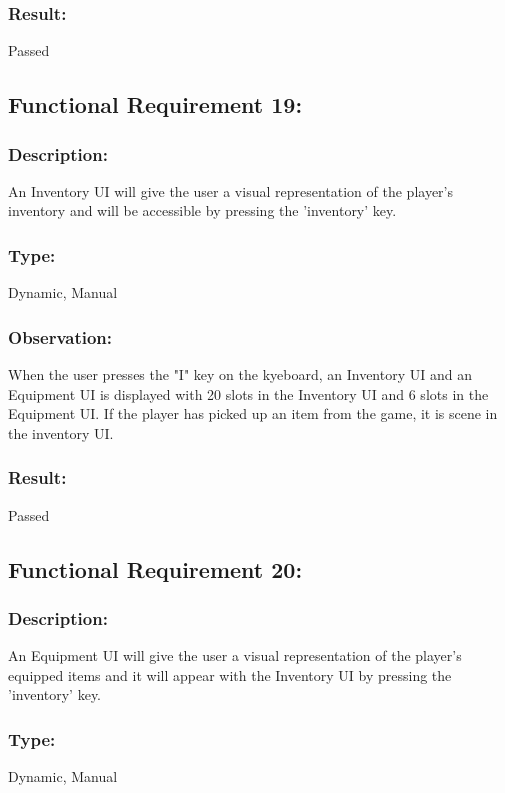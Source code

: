 \documentclass[12pt, titlepage]{article}
\begin{document}
\subsubsection[Pass / Fail:] {Result: } Passed


\subsection{Functional Requirement 19: } 

\subsubsection{Description: }An Inventory UI will give the user a visual representation of the player's inventory and will be accessible by pressing the 'inventory' key.
\subsubsection{Type: } Dynamic, Manual

\subsubsection{Observation: } When the user presses the "I" key on the kyeboard, an Inventory UI and an Equipment UI is displayed with 20 slots in the Inventory UI and 6 slots in the Equipment UI. If the player has picked up an item from the game, it is scene in the inventory UI.

\subsubsection[Pass / Fail:] {Result: } Passed


\subsection{Functional Requirement 20: } 

\subsubsection{Description: }An Equipment UI will give the user a visual representation of the player's equipped items and it will appear with the Inventory UI by pressing the 'inventory' key.
\subsubsection{Type: } Dynamic, Manual
\end{document}
